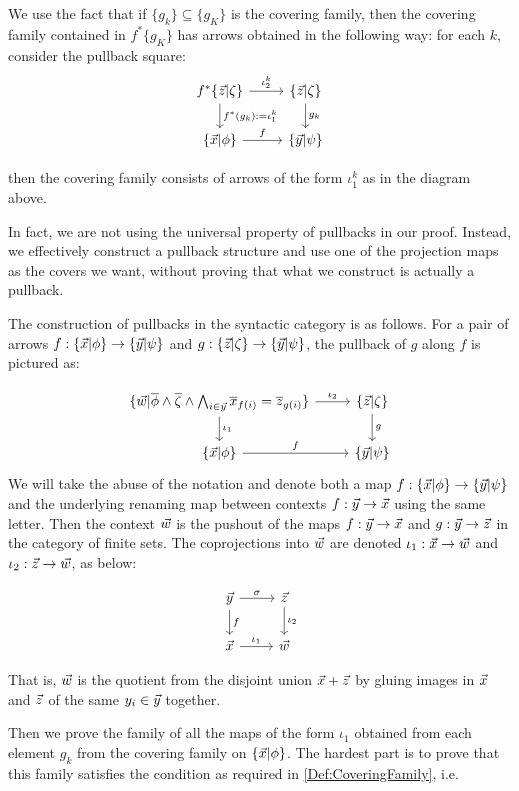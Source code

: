 We use the fact that if $\{g_k\}\subseteq \{g_K\}$ is the covering family, then the covering family contained in $f^*\{g_K\}$ has arrows obtained in the following 
way: for each $k$, consider the pullback square: 
\[
  \begin{tikzcd}
     f^* \zzeta \ar[r,"\iota_2^k"]\ar[d,"f^*(g_k):= \iota_1^k"]  & \zzeta\ar[d,"g_k"]\\
     \xphi \ar[r,"f"] & \ypsi
  \end{tikzcd}
\]

then the covering family consists of arrows of the form $\iota_1^k$ as in the diagram above.

In fact, we are not using the universal property of pullbacks in our proof. Instead, we effectively construct a pullback structure and use
one of the projection maps as the covers we want, without proving that what we construct is actually a pullback.

The construction of pullbacks in the syntactic category is as follows. For a pair of arrows $f: \{ \vec{x} | \phi \}\to \{ \vec{y} | \psi \}$ and $g:\{ \vec{z} | \zeta \}\to \{ \vec{y} | \psi \}$, 
the pullback of $g$ along $f$ is pictured as:


\[
  \begin{tikzcd}
     \fmlInCtx{\vw}{\ophi\land \ozeta \land\bigwedge_{i\in \vec{y}} \ox_{f(i)} = \oz_{g(i)}} \ar[r,"\iota_2"]\ar[d,"\iota_1"]  & \zzeta\ar[d,"g"]\\
     \xphi \ar[r,"f"] & \ypsi
  \end{tikzcd}
\]
We will take the abuse of the notation and denote both a map $f:\{ \vec{x} | \phi \}\to \{ \vec{y} | \psi \}$ and the underlying renaming map between contexts $f:\vec{y}\to \vec{x}$ 
using the same letter. 
Then the context $\vec{w}$ is the pushout of the maps $f:\vec{y}\to \vec{x}$ and $g:\vec{y}\to \vec{z}$ in the category of finite sets. 
The coprojections into $\vec{w}$ are denoted $\iota_1:\vec{x}\to\vec{w}$ and $\iota_2:\vec{z}\to \vec{w}$, as below:

\[
\begin{tikzcd}
 \vec{y}\ar[d,"f"]\ar[r,"\sigma"] & \vec{z}\ar[d,"\iota_2"]\\
 \vec{x}\ar[r,"\iota_1"] & \vec{w}
\end{tikzcd}
\]

That is, $\vec{w}$ is the quotient from the disjoint union $\vec{x} + \vec{z}$ by gluing images in $\vec{x}$ and $\vec{z}$ of the same $y_i\in \vec{y}$ together.


Then we prove the family of all the maps of the form $\iota_1$ obtained from each element $g_k$ from the covering family on $\{ \vec{x} | \phi \}$.
The hardest part is to prove that this family satisfies the condition as required in \ref{Def:CoveringFamily}, i.e.

